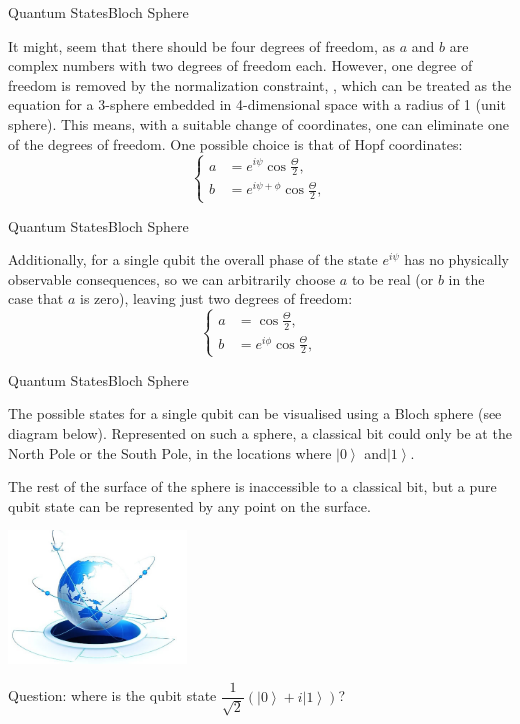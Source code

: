 \documentclass[beamer,serif]{beamer}
\begin{document}
\begin{frame}{Quantum States}{Bloch Sphere}
\par It might, seem that there should be four degrees of freedom, as $a$ and $b$ are complex numbers with two degrees of freedom each. However, one degree of freedom is removed by the normalization constraint, , which can be treated as the equation for a 3-sphere embedded in 4-dimensional space with a radius of 1 (unit sphere). This means, with a suitable change of coordinates, one can eliminate one of the degrees of freedom. One possible choice is that of Hopf coordinates:
\begin{equation}
\left\{
\begin{aligned}
a & = e^{i\psi}\cos\frac{\Theta}{2},	\\
b & = e^{i\psi+\phi}\cos\frac{\Theta}{2},
\end{aligned}
\right.
\end {equation}	
\end{frame}

\begin{frame}{Quantum States}{Bloch Sphere}
	\par Additionally, for a single qubit the overall phase of the state $e^{i\psi}$ has no physically observable consequences, so we can arbitrarily choose $a$ to be real (or $b$ in the case that $a$ is zero), leaving just two degrees of freedom:
	\begin{equation}
		\left\{
		\begin{aligned}
			a & = \cos\frac{\Theta}{2},	\\
			b & = e^{i\phi}\cos\frac{\Theta}{2},
		\end{aligned}
		\right.
	\end {equation}	
\end{frame}

\begin{frame}{Quantum States}{Bloch Sphere}
	\par The possible states for a single qubit can be visualised using a Bloch sphere (see diagram below). Represented on such a sphere, a classical bit could only be at the North Pole or the South Pole, in the locations where $\left| 0 \right\rangle$ and$\left| 1 \right\rangle$.
	\par The rest of the surface of the sphere is inaccessible to a classical bit, but a pure qubit state can be represented by any point on the surface.
	\par \includegraphics[height=100pt]{Sphere.png}
	\par Question: where is the qubit state $\dfrac{1}{\sqrt{2}}(\left|0\right\rangle+i\left|1\right\rangle)$?
\end{frame}
\end{document}

